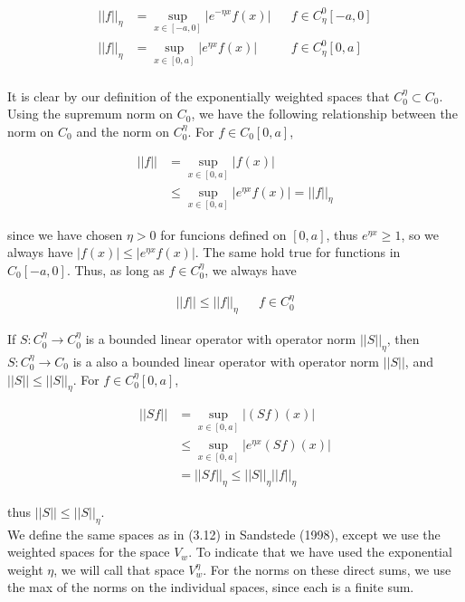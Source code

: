 \documentclass[12pt]{article}
\begin{document}
\begin{align*}
|| f ||_\eta &= \sup_{x \in [-a, 0]} |e^{-\eta x} f(x) | && f \in C^0_\eta[-a, 0] \\
|| f ||_\eta &= \sup_{x \in [0, a]} |e^{\eta x} f(x) | && f \in C^0_\eta[0, a] \\
\end{align*}

It is clear by our definition of the exponentially weighted spaces that $C_0^\eta \subset C_0$. Using the supremum norm on $C_0$, we have the following relationship between the norm on $C_0$ and the norm on $C_0^\eta$. For $f \in C_0[0, a]$,

\begin{align*}
|| f || &= \sup_{x \in [0,a]} | f(x) | \\
&\leq \sup_{x \in [0,a]} | e^{\eta x} f(x) | = ||f||_\eta
\end{align*}

since we have chosen $\eta > 0$ for funcions defined on $[0, a]$, thus $e^{\eta x} \geq 1$, so we always have $|f(x)| \leq  |e^{\eta x} f(x)|$. The same hold true for functions in $C_0[-a, 0]$. Thus, as long as $f \in C_0^\eta$, we always have

\begin{align*}
||f|| \leq ||f||_\eta && f \in C_0^\eta
\end{align*}

If $S: C_0^\eta \rightarrow C_0^\eta$ is a bounded linear operator with operator norm $||S||_\eta$, then $S: C_0^\eta \rightarrow C_0$ is a also a bounded linear operator with operator norm $||S||$, and $||S|| \leq ||S||_\eta$. For $f \in C_0^\eta[0,a]$,

\begin{align*}
||S f|| &= \sup_{x \in [0,a]} | (S f)(x) | \\
& \leq \sup_{x \in [0,a]} | e^{\eta x} (S f)(x) | \\
&= || S f ||_\eta \leq ||S||_\eta ||f||_\eta
\end{align*}

thus $||S|| \leq ||S||_\eta$.\\
 
We define the same spaces as in (3.12) in Sandstede (1998), except we use the weighted spaces for the space $V_w$. To indicate that we have used the exponential weight $\eta$, we will call that space $V_w^\eta$. For the norms on these direct sums, we use the max of the norms on the individual spaces, since each is a finite sum.\\
\end{document}
